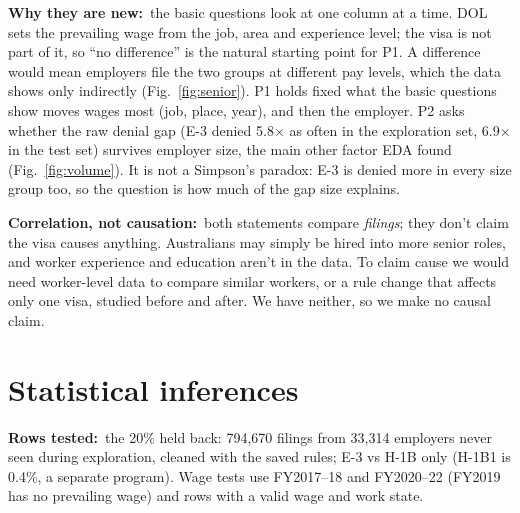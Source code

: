 \documentclass[10pt,a4paper,twocolumn]{article}
\newcommand{\field}[2]{\textbf{#1}~#2\par}
\begin{document}
\field{Why they are new:}{the basic questions look at one column at a time. DOL sets the
prevailing wage from the job, area and experience level; the visa is not part of it, so ``no
difference'' is the natural starting point for P1. A difference would mean employers file the two
groups at different pay levels, which the data shows only indirectly (Fig.~\ref{fig:senior}). P1
holds fixed what the basic questions show moves wages most (job, place, year), and then the
employer. P2 asks whether the raw denial gap (E-3 denied 5.8$\times$ as often in the exploration
set, 6.9$\times$ in the test set) survives employer size, the main other factor EDA found
(Fig.~\ref{fig:volume}). It is not a Simpson's paradox: E-3 is denied more in every size group
too, so the question is how much of the gap size explains.}

\field{Correlation, not causation:}{both statements compare \emph{filings}; they don't claim the
visa causes anything. Australians may simply be hired into more senior roles, and worker
experience and education aren't in the data. To claim cause we would need worker-level data to
compare similar workers, or a rule change that affects only one visa, studied before and after.
We have neither, so we make no causal claim.}

\section{Statistical inferences}

\field{Rows tested:}{the 20\% held back: 794{,}670 filings from 33{,}314 employers never seen
during exploration, cleaned with the saved rules; E-3 vs H-1B only (H-1B1 is 0.4\%, a separate
program). Wage tests use FY2017--18 and FY2020--22 (FY2019 has no prevailing wage) and rows with a
valid wage and work state.}
\end{document}
